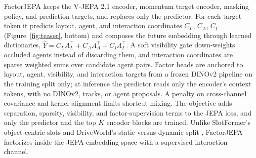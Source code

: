 \documentclass[letterpaper]{article} %
\begin{document}
FactorJEPA keeps the V-JEPA 2.1 encoder, momentum target encoder, masking policy, and prediction targets, and replaces only the predictor. For each target token it predicts layout, agent, and interaction coordinates $C_L$, $C_A$, $C_I$ (Figure~\ref{fig:teaser}, bottom) and composes the future embedding through learned dictionaries, $\widehat Y = C_L A_L^{\top} + C_A A_A^{\top} + C_I A_I^{\top}$. A soft visibility gate down-weights occluded agents instead of discarding them, and interaction coordinates are sparse weighted sums over candidate agent pairs. Factor heads are anchored to layout, agent, visibility, and interaction targets from a frozen DINOv2 pipeline \cite{oquab2024dinov2} on the training split only; at inference the predictor reads only the encoder's context tokens, with no DINOv2, tracks, or agent proposals. A penalty on cross-channel covariance and kernel alignment limits shortcut mixing. The objective adds separation, sparsity, visibility, and factor-supervision terms to the JEPA loss, and only the predictor and the top $K$ encoder blocks are trained. Unlike SlotFormer's object-centric slots \cite{wu2023slotformer} and DriveWorld's static versus dynamic split \cite{min2024driveworld}, FactorJEPA factorizes inside the JEPA embedding space with a supervised interaction channel.

{\small

}
\end{document}
